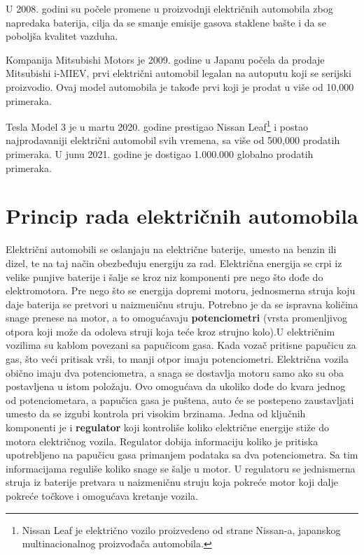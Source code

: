 \documentclass[a4paper]{article}
\begin{document}
U 2008. godini su počele promene u proizvodnji električnih automobila zbog napredaka baterija, cilja da se smanje emisije gasova staklene bašte i da se poboljša kvalitet vazduha.

Kompanija Mitsubishi Motors je 2009. godine u Japanu počela da prodaje Mitsubishi i-MIEV, prvi električni automobil legalan na autoputu koji se serijski proizvodio. Ovaj model automobila je takođe prvi koji je prodat u više od 10,000 primeraka.

Tesla Model 3 je u martu 2020. godine prestigao Nissan Leaf\footnote{Nissan Leaf je električno vozilo proizvedeno od strane Nissan-a, japanskog multinacionalnog proizvođača automobila.} i postao najprodavaniji električni automobil svih vremena, sa više od 500,000 prodatih primeraka. U junu 2021. godine je dostigao 1.000.000 globalno prodatih primeraka.
 

\section{Princip rada električnih automobila}

Električni automobili se oslanjaju na električne baterije, umesto na benzin ili dizel, te na taj način obezbeđuju energiju za rad. Električna energija se crpi iz velike punjive baterije i šalje se kroz niz komponenti pre nego što dođe do elektromotora. Pre nego što se energija dopremi motoru, jednosmerna struja koju daje baterija se pretvori u naizmeničnu struju.
Potrebno je da se ispravna količina snage prenese na motor, a to omogućavaju \textbf{potenciometri} (vrsta promenljivog otpora koji može da odoleva struji koja teće kroz strujno kolo).U električnim vozilima su kablom povezani sa papučicom gasa. Kada vozač pritisne papučicu za gas, što veći pritisak vrši, to manji otpor imaju potenciometri. Električna vozila obično imaju dva potenciometra, a snaga se dostavlja motoru samo ako su oba postavljena u istom položaju. Ovo omogućava da ukoliko dođe do kvara jednog od potenciometara, a papučica gasa je puštena, auto će se postepeno zaustavljati umesto da se izgubi kontrola pri visokim brzinama. Jedna od ključnih komponenti je i \textbf{regulator} koji kontroliše koliko električne energije stiže do motora električnog vozila. Regulator dobija informaciju koliko je pritiska upotrebljeno na papučicu gasa primanjem podataka sa dva potenciometra. Sa tim informacijama reguliše koliko snage se šalje u motor. U regulatoru se jednismerna struja iz baterije pretvara u naizmeničnu struju koja pokreće motor koji dalje pokreće točkove i omogućava kretanje vozila. 
\end{document}
